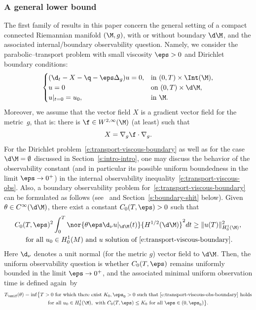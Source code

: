 \subsubsection{A general lower bound}
\label{s:sect-general}
The first family of results in this paper concern the general setting of a compact connected Riemannian manifold $(\M,g)$, with or without boundary $\d\M$, and the associated internal/boundary observability question. Namely, we consider the parabolic--transport problem with small viscosity $\eps>0$ and Dirichlet boundary conditions:
\begin{equation}
\label{e:transport-viscous-boundary}
\begin{cases}
(\d_t - X -\q - \eps \Delta_g ) u = 0, & \text{in } (0,T)\times\Int(\M), \\
u = 0 & \text{on } (0,T)\times \d\M, \\
u|_{t=0} = u_0, & \text{in } \M.
\end{cases}
\end{equation}
Moreover, we assume that the vector field $X$ is a gradient vector field for the metric~$g$, that is: there is $\f \in W^{2,\infty}(\M)$ (at least) such that
\[
X = \nabla_g \f \cdot \nabla_g.
\]
For the Dirichlet problem~\eqref{e:transport-viscous-boundary} as well as for the case $\d\M =\emptyset$ discussed in Section~\ref{s:intro-intro}, one may discuss the behavior of the observability constant (and in particular its possible uniform boundedness in the limit $\eps\to 0^+$) in the internal observability inequality~\eqref{e:transport-viscous-obs}.
Also, a boundary observability problem for~\eqref{e:transport-viscous-boundary} can be formulated as follows (see~\cite{GL:07} and Section~\ref{s:boundary-shit} below). Given $\theta \in C^\infty(\d\M)$, there exist a constant $C_0(T,\eps)>0$ such that
\begin{multline}
\label{e:transport-viscous-obs-boundary}
C_0(T,\eps)^2 \int_0^T\nor{ \theta \eps \d_{\nu} u|_{\d\M}(t)}{H^{1/2}(\d\M)}^2 dt \geq \|u (T)\|_{H^1_0(\M)}^2, \\
\text{ for all } u_0 \in H^1_0(M) \text{ and } u \text{ solution of~\eqref{e:transport-viscous-boundary}}.
\end{multline}
Here $\d_\nu$ denotes a unit normal (for the metric $g$) vector field to $\d\M$.
Then, the uniform observability question is whether $C_0(T,\eps)$ remains uniformly bounded in the limit $\eps\to 0^+$, and the associated minimal uniform observation time is defined again~by
\begin{multline*}
T_{\unif}(\theta) = \inf \bigl\{ T >0 \text{ for which there exist }K_0, \eps_0>0 \text{ such that~\eqref{e:transport-viscous-obs-boundary} holds}\\
\text {for all }u_0\in H^1_0(\M), \text{ with }C_0(T,\eps)\leq K_0 \text{ for all } \eps \in (0,\eps_0) \bigr\}.
\end{multline*}
